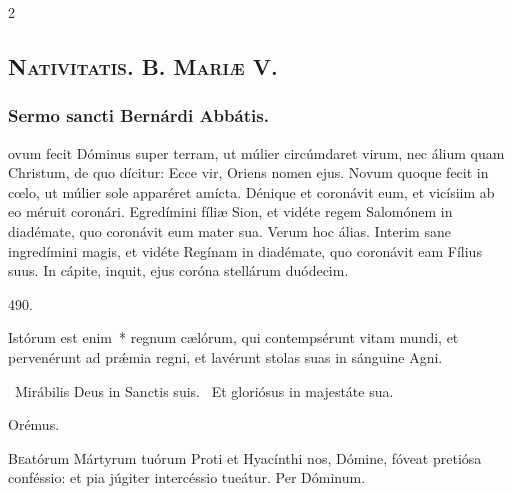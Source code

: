 \documentclass[9pt,twoside]{extarticle}
\begin{document}
\begin{multicols}{2}
\subsection*{\center \textsc{Nativitatis. B. Mariæ V.}}
\subsubsection*{\center {}}

\subsubsection*{\center Sermo sancti Bernárdi Abbátis.}
\begin{center}\end{center}
ovum fecit Dóminus super terram, ut múlier circúmdaret virum, nec álium quam Christum, de quo dícitur: Ecce vir, Oriens nomen ejus. Novum quoque fecit in cœlo, ut múlier sole apparéret amícta. Dénique et coronávit eum, et vicísiim ab eo méruit coronári. Egredímini fíliæ Sion, et vidéte regem Salomónem in diadémate, quo coronávit eum mater sua. Verum hoc álias. Interim sane ingredímini magis, et vidéte Regínam in diadémate, quo coronávit eam Fílius suus. In cápite, inquit, ejus coróna stellárum duódecim.

\begin{tightlist}{}
\item {} 490.
\item {} Istórum est enim~* regnum cælórum, qui contempsérunt vitam mundi, et pervenérunt ad prǽmia regni, et lavérunt stolas suas in sánguine Agni.
\item {}~Mirábilis Deus in Sanctis suis. ~Et gloriósus in majestáte sua.
\item Orémus. \hfill {}
\end{tightlist}
\lettrine{B}eatórum Mártyrum tuórum Proti et Hyacínthi nos, Dómine, fóveat pretiósa conféssio: et pia júgiter intercéssio tueátur. Per Dóminum.


\end{multicols}
\end{document}
